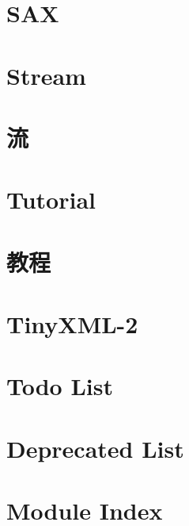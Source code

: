\documentclass[twoside]{book}
\newcommand{\+}{\discretionary{\mbox{\scriptsize$\hookleftarrow$}}{}{}}
\begin{document}
\chapter{S\+AX}
\label{md_Commun_Externe_RapidJSON_doc_sax.zh-cn}
\hypertarget{md_Commun_Externe_RapidJSON_doc_sax.zh-cn}{}

\chapter{Stream}
\label{md_Commun_Externe_RapidJSON_doc_stream}
\hypertarget{md_Commun_Externe_RapidJSON_doc_stream}{}

\chapter{流}
\label{md_Commun_Externe_RapidJSON_doc_stream.zh-cn}
\hypertarget{md_Commun_Externe_RapidJSON_doc_stream.zh-cn}{}

\chapter{Tutorial}
\label{md_Commun_Externe_RapidJSON_doc_tutorial}
\hypertarget{md_Commun_Externe_RapidJSON_doc_tutorial}{}

\chapter{教程}
\label{md_Commun_Externe_RapidJSON_doc_tutorial.zh-cn}
\hypertarget{md_Commun_Externe_RapidJSON_doc_tutorial.zh-cn}{}

\chapter{Tiny\+X\+M\+L-\/2}
\label{md_Commun_Externe_tinyxml2_readme}
\hypertarget{md_Commun_Externe_tinyxml2_readme}{}

\chapter{Todo List}
\label{todo}
\hypertarget{todo}{}

\chapter{Deprecated List}
\label{deprecated}
\hypertarget{deprecated}{}

\chapter{Module Index}

\end{document}
